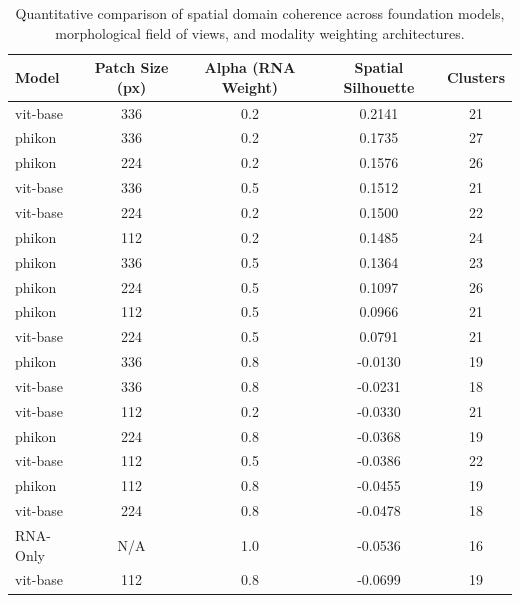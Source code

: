 \begin{table}[h!]
\centering
\begin{tabular}{l c c c c}
\hline
\textbf{Model} & \textbf{Patch Size (px)} & \textbf{Alpha (RNA Weight)} & \textbf{Spatial Silhouette} & \textbf{Clusters} \\\hline
vit-base & 336 & 0.2 & 0.2141 & 21 \\
phikon & 336 & 0.2 & 0.1735 & 27 \\
phikon & 224 & 0.2 & 0.1576 & 26 \\
vit-base & 336 & 0.5 & 0.1512 & 21 \\
vit-base & 224 & 0.2 & 0.1500 & 22 \\
phikon & 112 & 0.2 & 0.1485 & 24 \\
phikon & 336 & 0.5 & 0.1364 & 23 \\
phikon & 224 & 0.5 & 0.1097 & 26 \\
phikon & 112 & 0.5 & 0.0966 & 21 \\
vit-base & 224 & 0.5 & 0.0791 & 21 \\
phikon & 336 & 0.8 & -0.0130 & 19 \\
vit-base & 336 & 0.8 & -0.0231 & 18 \\
vit-base & 112 & 0.2 & -0.0330 & 21 \\
phikon & 224 & 0.8 & -0.0368 & 19 \\
vit-base & 112 & 0.5 & -0.0386 & 22 \\
phikon & 112 & 0.8 & -0.0455 & 19 \\
vit-base & 224 & 0.8 & -0.0478 & 18 \\
RNA-Only & N/A & 1.0 & -0.0536 & 16 \\
vit-base & 112 & 0.8 & -0.0699 & 19 \\
\hline
\end{tabular}
\caption{Quantitative comparison of spatial domain coherence across foundation models, morphological field of views, and modality weighting architectures.}
\label{tab:benchmark_results}
\end{table}
